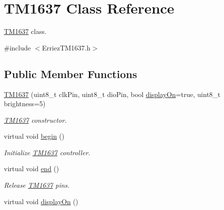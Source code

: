 \hypertarget{class_t_m1637}{}\section{T\+M1637 Class Reference}
\label{class_t_m1637}


\hyperlink{class_t_m1637}{T\+M1637} class.  




{\ttfamily \#include $<$Erriez\+T\+M1637.\+h$>$}

\subsection*{Public Member Functions}
\begin{DoxyCompactItemize}
\item 
\hyperlink{class_t_m1637_a670017ac81f233a90e0376c453ffde3e}{T\+M1637} (uint8\+\_\+t clk\+Pin, uint8\+\_\+t dio\+Pin, bool \hyperlink{class_t_m1637_a7e668bc225e6b2ee9f1b3097531277b2}{display\+On}=true, uint8\+\_\+t brightness=5)
\begin{DoxyCompactList}\small\item\em \hyperlink{class_t_m1637}{T\+M1637} constructor. \end{DoxyCompactList}\item 
virtual void \hyperlink{class_t_m1637_a78f17a3cc084024d7d1c8010d3c114be}{begin} ()\hypertarget{class_t_m1637_a78f17a3cc084024d7d1c8010d3c114be}{}\label{class_t_m1637_a78f17a3cc084024d7d1c8010d3c114be}

\begin{DoxyCompactList}\small\item\em Initialize \hyperlink{class_t_m1637}{T\+M1637} controller. \end{DoxyCompactList}\item 
virtual void \hyperlink{class_t_m1637_ac123b614c1154e1b6ceb42ae35026b34}{end} ()\hypertarget{class_t_m1637_ac123b614c1154e1b6ceb42ae35026b34}{}\label{class_t_m1637_ac123b614c1154e1b6ceb42ae35026b34}

\begin{DoxyCompactList}\small\item\em Release \hyperlink{class_t_m1637}{T\+M1637} pins. \end{DoxyCompactList}\item 
virtual void \hyperlink{class_t_m1637_a7e668bc225e6b2ee9f1b3097531277b2}{display\+On} ()\hypertarget{class_t_m1637_a7e668bc225e6b2ee9f1b3097531277b2}{}\label{class_t_m1637_a7e668bc225e6b2ee9f1b3097531277b2}


\end{DoxyCompactItemize}
